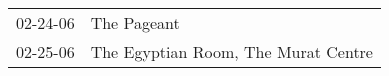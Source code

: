\begin{supertabular}{p{0.07\textwidth}p{0.23\textwidth}}
 02-24-06 &                          The Pageant \\
 02-25-06 &  The Egyptian Room, The Murat Centre \\
\end{supertabular}
